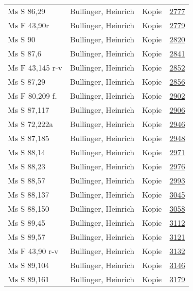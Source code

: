 \documentclass[10pt,a4paper,landscape]{report}
\begin{document}
\begin{longtable}{p{16cm}p{4cm}lr}
Ms S 86,29	&	Bullinger, Heinrich	&	Kopie	&	\href{http://130.60.24.72/assignment/2777}{2777}\\
Ms F 43,90r	&	Bullinger, Heinrich	&	Kopie	&	\href{http://130.60.24.72/assignment/2779}{2779}\\
Ms S 90	&	Bullinger, Heinrich	&	Kopie	&	\href{http://130.60.24.72/assignment/2820}{2820}\\
Ms S 87,6	&	Bullinger, Heinrich	&	Kopie	&	\href{http://130.60.24.72/assignment/2841}{2841}\\
Ms F 43,145 r-v	&	Bullinger, Heinrich	&	Kopie	&	\href{http://130.60.24.72/assignment/2852}{2852}\\
Ms S 87,29	&	Bullinger, Heinrich	&	Kopie	&	\href{http://130.60.24.72/assignment/2856}{2856}\\
Ms F 80,209 f.	&	Bullinger, Heinrich	&	Kopie	&	\href{http://130.60.24.72/assignment/2902}{2902}\\
Ms S 87,117	&	Bullinger, Heinrich	&	Kopie	&	\href{http://130.60.24.72/assignment/2906}{2906}\\
Ms S 72,222a	&	Bullinger, Heinrich	&	Kopie	&	\href{http://130.60.24.72/assignment/2946}{2946}\\
Ms S 87,185	&	Bullinger, Heinrich	&	Kopie	&	\href{http://130.60.24.72/assignment/2948}{2948}\\
Ms S 88,14	&	Bullinger, Heinrich	&	Kopie	&	\href{http://130.60.24.72/assignment/2971}{2971}\\
Ms S 88,23	&	Bullinger, Heinrich	&	Kopie	&	\href{http://130.60.24.72/assignment/2976}{2976}\\
Ms S 88,57	&	Bullinger, Heinrich	&	Kopie	&	\href{http://130.60.24.72/assignment/2993}{2993}\\
Ms S 88,137	&	Bullinger, Heinrich	&	Kopie	&	\href{http://130.60.24.72/assignment/3045}{3045}\\
Ms S 88,150	&	Bullinger, Heinrich	&	Kopie	&	\href{http://130.60.24.72/assignment/3058}{3058}\\
Ms S 89,45	&	Bullinger, Heinrich	&	Kopie	&	\href{http://130.60.24.72/assignment/3112}{3112}\\
Ms S 89,57	&	Bullinger, Heinrich	&	Kopie	&	\href{http://130.60.24.72/assignment/3121}{3121}\\
Ms F 43,90 r-v	&	Bullinger, Heinrich	&	Kopie	&	\href{http://130.60.24.72/assignment/3132}{3132}\\
Ms S 89,104	&	Bullinger, Heinrich	&	Kopie	&	\href{http://130.60.24.72/assignment/3146}{3146}\\
Ms S 89,161	&	Bullinger, Heinrich	&	Kopie	&	\href{http://130.60.24.72/assignment/3179}{3179}\\

\end{longtable}
\end{document}
